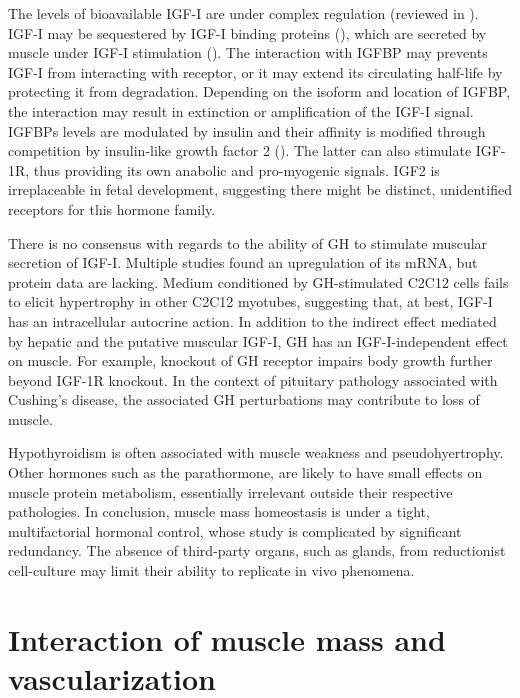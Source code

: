\documentclass[12pt,english]{report}\usepackage[]{graphicx}\usepackage[]{color}
\begin{document}
The levels of bioavailable IGF-I are under complex regulation (reviewed
in \citep{chao2008igf2:,velloso2008regulation}). IGF-I may be sequestered
by IGF-I binding proteins (),
which are secreted by muscle under IGF-I stimulation (\citep{tomas1992insulin-like}).
The interaction with IGFBP may prevents IGF-I from interacting with
receptor, or it may extend its circulating half-life by protecting
it from degradation. Depending on the isoform and location of IGFBP,
the interaction may result in extinction or amplification of the IGF-I
signal. IGFBPs levels are modulated by insulin and their affinity
is modified through competition by insulin-like growth factor 2 ().
The latter can also stimulate IGF-1R, thus providing its own anabolic
and pro-myogenic signals\citep{wilson2003autocrine}. IGF2 is irreplaceable
in fetal development\citep{dechiara1991parental}, suggesting there
might be distinct, unidentified receptors for this hormone family.

There is no consensus with regards to the ability of GH to stimulate
muscular secretion of IGF-I. Multiple studies found an upregulation
of its mRNA\citep{imanaka2008growth,resmini2011identification}, but
protein data are lacking. Medium conditioned by GH-stimulated C2C12
cells fails to elicit hypertrophy in other C2C12 myotubes\citep{sotiropoulos2006growth},
suggesting that, at best, IGF-I has an intracellular autocrine action.
In addition to the indirect effect mediated by hepatic and the putative
muscular IGF-I, GH has an IGF-I-independent effect on muscle. For
example, knockout of GH receptor impairs body growth further beyond
IGF-1R knockout\citep{lupu2001roles}. In the context of pituitary
pathology associated with Cushing's disease, the associated GH perturbations
may contribute to loss of muscle. 

Hypothyroidism is often associated with muscle weakness and pseudohyertrophy\citep{mastropasqua2003hoffmans}.
Other hormones such as the parathormone, are likely to have small
effects on muscle protein metabolism, essentially irrelevant outside
their respective pathologies\citep{garber1983effects}. In conclusion,
muscle mass homeostasis is under a tight, multifactorial hormonal
control, whose study is complicated by significant redundancy. The
absence of third-party organs, such as glands, from reductionist cell-culture
may limit their ability to replicate in vivo phenomena.


\section{Interaction of muscle mass and vascularization}
\end{document}
